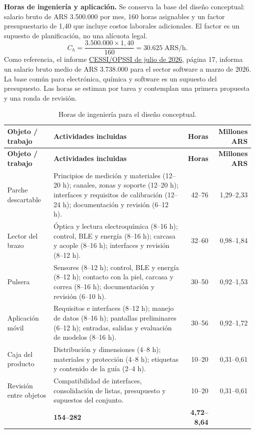 \noindent\textbf{Horas de ingeniería y aplicación.}
Se conserva la base del diseño conceptual: salario bruto de ARS 3.500.000 por mes, 160 horas asignables y un factor presupuestario de 1,40 que incluye costos laborales adicionales. El factor es un supuesto de planificación, no una alícuota legal.
\[
C_h=\frac{3.500.000\times1{,}40}{160}=30.625\;\mathrm{ARS/h}.
\]
Como referencia, el informe \href{https://cessi.org.ar/wp-content/uploads/2026/07/OPSSI-Reporte-Industria-Software-1er.-trim.-2026.pdf}{CESSI/OPSSI de julio de 2026}, página 17, informa un salario bruto medio de ARS 3.738.000 para el sector software a marzo de 2026. La base común para electrónica, química y software es un supuesto del presupuesto. Las horas se estiman por tarea y contemplan una primera propuesta y una ronda de revisión.
{\footnotesize
\setlength{\tabcolsep}{4pt}
\renewcommand{\arraystretch}{1.18}
\begin{xltabular}{\linewidth}{@{}>{\raggedright\arraybackslash}p{2.4cm}>{\raggedright\arraybackslash}X r r@{}}
\caption{Horas de ingeniería para el diseño conceptual.}\label{tab:costo-ingenieria}\\
\toprule
\textbf{Objeto / trabajo} & \textbf{Actividades incluidas} & \textbf{Horas} & \textbf{Millones ARS}\\
\midrule
\endfirsthead
\toprule
\textbf{Objeto / trabajo} & \textbf{Actividades incluidas} & \textbf{Horas} & \textbf{Millones ARS}\\
\midrule
\endhead
\bottomrule\endfoot

Parche descartable & Principios de medición y materiales (12--20 h); canales, zonas y soporte (12--20 h); interfaces y requisitos de calibración (12--24 h); documentación y revisión (6--12 h). & 42--76 & 1,29--2,33\\
\addlinespace
Lector del brazo & Óptica y lectura electroquímica (8--16 h); control, BLE y energía (8--16 h); carcasa y acople (8--16 h); interfaces y revisión (8--12 h). & 32--60 & 0,98--1,84\\
\addlinespace
Pulsera & Sensores (8--12 h); control, BLE y energía (8--12 h); contacto con la piel, carcasa y correa (8--16 h); documentación y revisión (6--10 h). & 30--50 & 0,92--1,53\\
\addlinespace
Aplicación móvil & Requisitos e interfaces (8--12 h); manejo de datos (8--16 h); pantallas preliminares (6--12 h); entradas, salidas y evaluación de modelos (8--16 h). & 30--56 & 0,92--1,72\\
\addlinespace
Caja del producto & Distribución y dimensiones (4--8 h); materiales y protección (4--8 h); etiquetas y contenido de la guía (2--4 h). & 10--20 & 0,31--0,61\\
\addlinespace
Revisión entre objetos & Compatibilidad de interfaces, consolidación de listas, presupuesto y supuestos del conjunto. & 10--20 & 0,31--0,61\\
\midrule
{} & \textbf{154--282} & \textbf{4,72--8,64}\\
\bottomrule
\end{xltabular}
}

